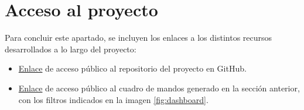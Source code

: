 \section{Acceso al proyecto}

Para concluir este apartado, se incluyen los enlaces a los distintos recursos desarrollados a lo largo del proyecto:

\begin{itemize}
    \item \href{https://github.com/Zalez95/TFM}{Enlace} de acceso público al repositorio del proyecto en GitHub.
    \item \href{http://3.250.43.138:3000/d/K0aCHsjnk/valltourisminstadashboard?orgId=1&from=1654898400000&to=1656885599000&var-filter1=gender%7C%3D%7CMale&var-filter1=ageLow%7C%3E%7C18.0&var-filter1=fearConfidence%7C%3C%7C30.72262954711914&var-filter1=disgustedConfidence%7C%3C%7C30.894670486450195&var-filter1=sadConfidence%7C%3C%7C30.618297576904297&var-filter1=angryConfidence%7C%3C%7C30.479755401611328}{Enlace} de acceso público al cuadro de mandos generado en la sección anterior, con los filtros indicados en la imagen \ref{fig:dashboard}.
\end{itemize}

